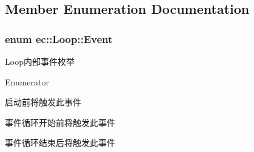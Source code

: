 \subsection{Member Enumeration Documentation}
\hypertarget{classec_1_1Loop_ac861df4ad2e7779e31932b2171935f81}{
\subsubsection[{Event}]{\setlength{\rightskip}{0pt plus 5cm}enum {\bf ec\-::\-Loop\-::\-Event}}}\label{classec_1_1Loop_ac861df4ad2e7779e31932b2171935f81}


Loop内部事件枚举 

\begin{Desc}
\item[Enumerator]\par
\begin{description}
\item[{\em 
\hypertarget{classec_1_1Loop_ac861df4ad2e7779e31932b2171935f81ae18354c950ca663c8eeb805eb0635ce7}{k\-Event\-Run}\label{classec_1_1Loop_ac861df4ad2e7779e31932b2171935f81ae18354c950ca663c8eeb805eb0635ce7}
}]启动前将触发此事件 \item[{\em 
\hypertarget{classec_1_1Loop_ac861df4ad2e7779e31932b2171935f81af538557b2dd5e6dd576a16a8b510f9d8}{k\-Event\-End}\label{classec_1_1Loop_ac861df4ad2e7779e31932b2171935f81af538557b2dd5e6dd576a16a8b510f9d8}
}]事件循环开始前将触发此事件 \item[{\em 
\hypertarget{classec_1_1Loop_ac861df4ad2e7779e31932b2171935f81a4ce3e65585742fda1ced3e6ba87bb80c}{k\-Event\-Max}\label{classec_1_1Loop_ac861df4ad2e7779e31932b2171935f81a4ce3e65585742fda1ced3e6ba87bb80c}
}]事件循环结束后将触发此事件 \end{description}
\end{Desc}


